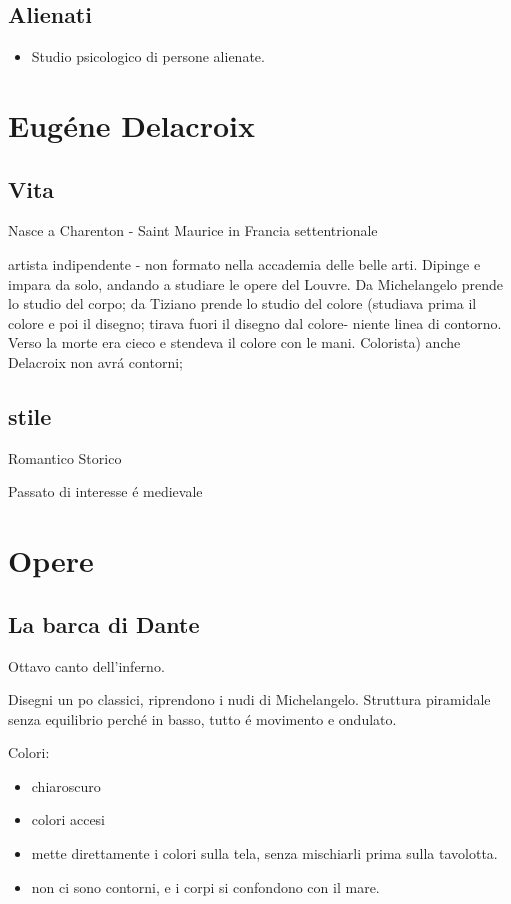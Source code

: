 \documentclass{article}
\begin{document}
\subsection{Alienati}
\begin{itemize}
    \item Studio psicologico di persone alienate.
\end{itemize}
\section{Eugéne Delacroix}
\subsection{Vita}
Nasce a Charenton - Saint Maurice in Francia settentrionale

artista indipendente - non formato nella accademia delle belle arti. Dipinge e impara da solo, andando a studiare le opere del Louvre. Da Michelangelo prende lo studio del corpo; da Tiziano prende lo studio del colore (studiava prima il colore e poi il disegno; tirava fuori il disegno dal colore- niente linea di contorno. Verso la morte era cieco e stendeva il colore con le mani. Colorista) anche Delacroix non avrá contorni;
\subsection{stile}
Romantico Storico

Passato di interesse é medievale
\section{Opere}
\subsection{La barca di Dante}
Ottavo canto dell'inferno.

Disegni un po classici, riprendono i nudi di Michelangelo. Struttura piramidale senza equilibrio perché in basso, tutto é movimento e ondulato.

Colori:
\begin{itemize}
\item chiaroscuro
\item colori accesi
\item mette direttamente i colori sulla tela, senza mischiarli prima sulla tavolotta.
\item non ci sono contorni, e i corpi si confondono con il mare.
\end{itemize}
\end{document}
